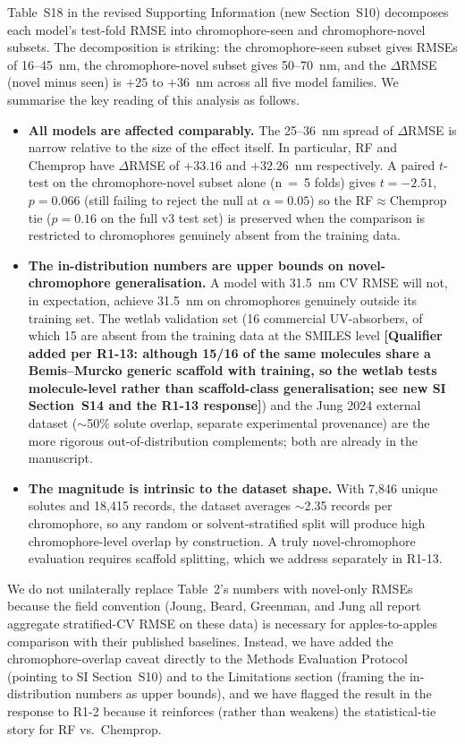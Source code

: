 \documentclass[11pt]{article}
\begin{document}
{Table~S18 in the revised Supporting Information (new Section~S10) decomposes each model's test-fold RMSE into chromophore-seen and chromophore-novel subsets. The decomposition is striking: the chromophore-seen subset gives RMSEs of 16--45~nm, the chromophore-novel subset gives 50--70~nm, and the $\Delta$RMSE (novel minus seen) is $+25$ to $+36$~nm across all five model families. We summarise the key reading of this analysis as follows.
\begin{itemize}[leftmargin=2em,itemsep=2pt]
 \item \textbf{All models are affected comparably.} The 25--36~nm spread of $\Delta$RMSE is narrow relative to the size of the effect itself. In particular, RF and Chemprop have $\Delta$RMSE of $+33.16$ and $+32.26$~nm respectively. A paired $t$-test on the chromophore-novel subset alone (n~=~5 folds) gives $t = -2.51$, $p = 0.066$ (still failing to reject the null at $\alpha = 0.05$) so the RF$\approx$Chemprop tie ($p = 0.16$ on the full v3 test set) is preserved when the comparison is restricted to chromophores genuinely absent from the training data.
  \item \textbf{The in-distribution numbers are upper bounds on novel-chromophore generalisation.} A model with 31.5~nm CV RMSE will not, in expectation, achieve 31.5~nm on chromophores genuinely outside its training set. The wetlab validation set (16 commercial UV-absorbers, of which 15 are absent from the training data at the SMILES level \textbf{[Qualifier added per R1-13: although 15/16 of the same molecules share a Bemis--Murcko generic scaffold with training, so the wetlab tests molecule-level rather than scaffold-class generalisation; see new SI Section~S14 and the R1-13 response]}) and the Jung 2024 external dataset ($\sim$50\% solute overlap, separate experimental provenance) are the more rigorous out-of-distribution complements; both are already in the manuscript.
  \item \textbf{The magnitude is intrinsic to the dataset shape.} With 7{,}846 unique solutes and 18{,}415 records, the dataset averages $\sim$2.35 records per chromophore, so any random or solvent-stratified split will produce high chromophore-level overlap by construction. A truly novel-chromophore evaluation requires scaffold splitting, which we address separately in R1-13.
\end{itemize}

We do not unilaterally replace Table~2's numbers with novel-only RMSEs because the field convention (Joung, Beard, Greenman, and Jung all report aggregate stratified-CV RMSE on these data) is necessary for apples-to-apples comparison with their published baselines. Instead, we have added the chromophore-overlap caveat directly to the Methods Evaluation Protocol (pointing to SI Section~S10) and to the Limitations section (framing the in-distribution numbers as upper bounds), and we have flagged the result in the response to R1-2 because it reinforces (rather than weakens) the statistical-tie story for RF vs.\ Chemprop.

}
\end{document}
